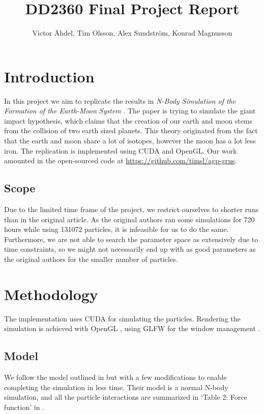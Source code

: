 \documentclass[a4paper]{article}
\title{DD2360 Final Project Report}
\author{Victor Ähdel, Tim Olsson, Alex Sundström, Konrad Magnusson}
\begin{document}
\maketitle

\section{Introduction}

In this project we aim to replicate the results in \emph{N-Body Simulation of the Formation of the Earth-Moon System} \cite{simulation_paper}.
The paper is trying to simulate the giant impact hypothesis, which claims that the creation of our earth and moon stems from the collision of two earth sized planets.
This theory originated from the fact that the earth and moon share a lot of isotopes, however the moon has a lot less iron.
The replication is implemented using CUDA and OpenGL.
Our work amounted in the open-sourced code at \url{https://github.com/timsl/agp-grus}.

\subsection{Scope}

Due to the limited time frame of the project, we restrict ourselves to shorter runs than in the original article.
As the original authors ran some simulations for 720 hours while using 131072 particles, it is infeasible for us to do the same.
Furthermore, we are not able to search the parameter space as extensively due to time constraints, so we might not necessarily end up with as good parameters as the original authors for the smaller number of particles.

\section{Methodology}

The implementation uses CUDA \cite{Cuda} for simulating the particles.
Rendering the simulation is achieved with OpenGL \cite{opengl}, using GLFW for the window management \cite{glfw}.

\subsection{Model}

We follow the model outlined in \cite{simulation_paper} but with a few modifications to enable completing the simulation in less time.
Their model is a normal N-body simulation, and all the particle interactions are summarized in `Table 2: Force function' in \cite{simulation_paper}.
\end{document}
